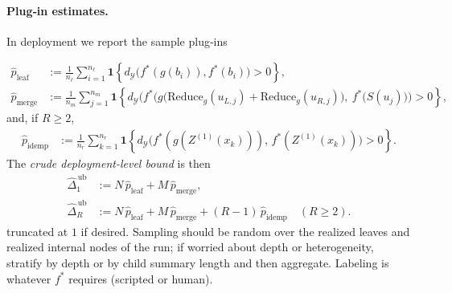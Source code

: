 \documentclass[11pt]{article}
\newcommand{\Y}{\mathcal{Y}}               %
\newcommand{\fstar}{f^*}               %
\newcommand{\metric}{d_{\Y}}
\newcommand{\reduce}{\text{Reduce}}
\newcommand{\reduceg}{\reduce_g}
\begin{document}
\paragraph{Plug‑in estimates.}
In deployment we report the sample plug‑ins

\begin{align*}
\widehat p_{\mathrm{leaf}} &:= \frac{1}{n_\ell}\sum_{i=1}^{n_\ell}\mathbf{1}\!\left\{\metric\!\big(\fstar(g(b_i)),\fstar(b_i)\big)>0\right\}, \\
\widehat p_{\mathrm{merge}} &:= \frac{1}{n_m}\sum_{j=1}^{n_m}\mathbf{1}\!\left\{\metric\!\Big(\fstar\!\big(g(\reduceg(u_{L,j})\!+\!\reduceg(u_{R,j})\big),\ \fstar\!\big(S(u_j)\big)\Big)>0\right\},
\end{align*}
and, if $R\ge2$,
\begin{align*}
\widehat p_{\mathrm{idemp}} &:= \frac{1}{n_r}\sum_{k=1}^{n_r}\mathbf{1}\!\left\{\metric\!\big(\fstar(g(Z^{(1)}(x_k))),\,\fstar(Z^{(1)}(x_k))\big)>0\right\}.
\end{align*}
The \emph{crude deployment-level bound} is then
\begin{align*}
\widehat\Delta_1^{\,\mathrm{ub}} &:= N\,\widehat p_{\mathrm{leaf}} + M\,\widehat p_{\mathrm{merge}}, \\
\widehat\Delta_R^{\,\mathrm{ub}} &:= N\,\widehat p_{\mathrm{leaf}} + M\,\widehat p_{\mathrm{merge}} + (R-1)\,\widehat p_{\mathrm{idemp}}\quad(R\ge2).
\end{align*}
truncated at $1$ if desired. Sampling should be random over the realized leaves and realized
internal nodes of the run; if worried about depth or heterogeneity, stratify by depth or by child
summary length and then aggregate. Labeling is whatever $\fstar$ requires (scripted or human).
\end{document}
